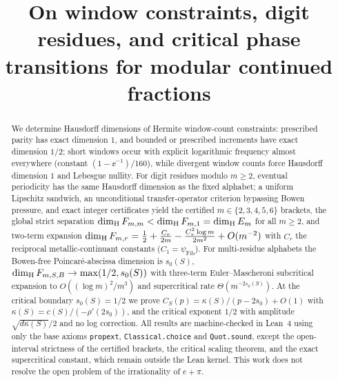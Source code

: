 \title{On window constraints, digit residues, and critical phase transitions
for modular continued fractions}


\maketitle

\begin{abstract}
We determine Hausdorff dimensions of Hermite window-count
constraints: prescribed parity has exact dimension $1$,
and bounded or prescribed increments have exact dimension $1/2$; short windows
occur with explicit logarithmic frequency almost everywhere (constant
$(1-\ee^{-1})/160$), while divergent window counts force Hausdorff dimension
$1$ and Lebesgue nullity. For digit residues modulo $m\ge2$, eventual
periodicity has the same Hausdorff dimension as the fixed alphabet; a
uniform Lipschitz sandwich, an unconditional transfer-operator
criterion bypassing Bowen pressure, and exact
integer certificates yield the certified $m\in\{2,3,4,5,6\}$ brackets, the
global strict separation $\dim_{\mathrm{H}} F_{m,m}<\dim_{\mathrm{H}} F_{m,1}=\dim_{\mathrm{H}} E_m$ for all
$m\ge2$, and two-term expansion
$\dim_{\mathrm{H}} F_{m,r}=\frac12+\frac{C_r}{2m}-\frac{C_r^2\log m}{2m^2}+O(m^{-2})$
with $C_r$ the reciprocal metallic-continuant constants
($C_1=\psi_{\mathrm{Fib}}$). For multi-residue alphabets
the Bowen-free Poincar\'e-abscissa dimension is $s_0(S)$,
$\dim_{\mathrm{H}} F_{m,S,B}\to\max(1/2,s_0(S))$ with three-term Euler--Mascheroni
subcritical expansion to $O((\log m)^2/m^3)$ and supercritical rate
$\Theta(m^{-2s_0(S)})$. At the critical boundary $s_0(S)=1/2$ we prove
$C_S(p)=\kappa(S)/(p-2s_0)+O(1)$ with
$\kappa(S)=c(S)/(-\rho'(2s_0))$, and the critical exponent $1/2$ with amplitude
$\sqrt{d\kappa(S)}/2$ and no log correction.
All results are machine-checked in Lean~4 using only the base axioms
\texttt{propext}, \texttt{Classical.choice} and \texttt{Quot.sound}, except
the open-interval strictness of the certified brackets, the critical scaling
theorem, and the exact supercritical constant, which remain outside
the Lean kernel.
This work does not resolve the open problem of the irrationality of $e+\pi$.
\end{abstract}

